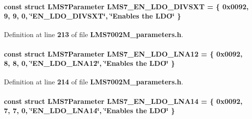 \paragraph[{L\+M\+S7\+\_\+\+E\+N\+\_\+\+L\+D\+O\+\_\+\+D\+I\+V\+S\+XT}]{\setlength{\rightskip}{0pt plus 5cm}const struct {\bf L\+M\+S7\+Parameter} L\+M\+S7\+\_\+\+E\+N\+\_\+\+L\+D\+O\+\_\+\+D\+I\+V\+S\+XT = \{ 0x0092, 9, 9, 0, \char`\"{}\+E\+N\+\_\+\+L\+D\+O\+\_\+\+D\+I\+V\+S\+X\+T\char`\"{}, \char`\"{}\+Enables the L\+D\+O\char`\"{} \}\hspace{0.3cm}{\ttfamily [static]}}\label{LMS7002M__parameters_8h_a2fa1b217e4f2c1938ccbf38b54a623fc}


Definition at line {\bf 213} of file {\bf L\+M\+S7002\+M\+\_\+parameters.\+h}.

\paragraph[{L\+M\+S7\+\_\+\+E\+N\+\_\+\+L\+D\+O\+\_\+\+L\+N\+A12}]{\setlength{\rightskip}{0pt plus 5cm}const struct {\bf L\+M\+S7\+Parameter} L\+M\+S7\+\_\+\+E\+N\+\_\+\+L\+D\+O\+\_\+\+L\+N\+A12 = \{ 0x0092, 8, 8, 0, \char`\"{}\+E\+N\+\_\+\+L\+D\+O\+\_\+\+L\+N\+A12\char`\"{}, \char`\"{}\+Enables the L\+D\+O\char`\"{} \}\hspace{0.3cm}{\ttfamily [static]}}\label{LMS7002M__parameters_8h_a67f9f07ca95e8fdd25c8e28117983171}


Definition at line {\bf 214} of file {\bf L\+M\+S7002\+M\+\_\+parameters.\+h}.

\paragraph[{L\+M\+S7\+\_\+\+E\+N\+\_\+\+L\+D\+O\+\_\+\+L\+N\+A14}]{\setlength{\rightskip}{0pt plus 5cm}const struct {\bf L\+M\+S7\+Parameter} L\+M\+S7\+\_\+\+E\+N\+\_\+\+L\+D\+O\+\_\+\+L\+N\+A14 = \{ 0x0092, 7, 7, 0, \char`\"{}\+E\+N\+\_\+\+L\+D\+O\+\_\+\+L\+N\+A14\char`\"{}, \char`\"{}\+Enables the L\+D\+O\char`\"{} \}\hspace{0.3cm}{\ttfamily [static]}}\label{LMS7002M__parameters_8h_a7758afd5dce83dd1580ab5802f2b7958}


